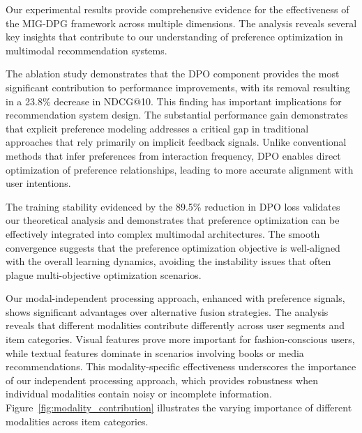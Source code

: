 \documentclass[pdflatex,sn-mathphys-num]{sn-jnl}%
\theoremstyle{thmstyleone}%
\theoremstyle{thmstyletwo}%
\theoremstyle{thmstylethree}%
\begin{document}
Our experimental results provide comprehensive evidence for the effectiveness of the MIG-DPG framework across multiple dimensions. The analysis reveals several key insights that contribute to our understanding of preference optimization in multimodal recommendation systems.

The ablation study demonstrates that the DPO component provides the most significant contribution to performance improvements, with its removal resulting in a 23.8\% decrease in NDCG@10. This finding has important implications for recommendation system design. The substantial performance gain demonstrates that explicit preference modeling addresses a critical gap in traditional approaches that rely primarily on implicit feedback signals. Unlike conventional methods that infer preferences from interaction frequency, DPO enables direct optimization of preference relationships, leading to more accurate alignment with user intentions.

The training stability evidenced by the 89.5\% reduction in DPO loss validates our theoretical analysis and demonstrates that preference optimization can be effectively integrated into complex multimodal architectures. The smooth convergence suggests that the preference optimization objective is well-aligned with the overall learning dynamics, avoiding the instability issues that often plague multi-objective optimization scenarios.

Our modal-independent processing approach, enhanced with preference signals, shows significant advantages over alternative fusion strategies. The analysis reveals that different modalities contribute differently across user segments and item categories. Visual features prove more important for fashion-conscious users, while textual features dominate in scenarios involving books or media recommendations. This modality-specific effectiveness underscores the importance of our independent processing approach, which provides robustness when individual modalities contain noisy or incomplete information. Figure~\ref{fig:modality_contribution} illustrates the varying importance of different modalities across item categories.
\end{document}
